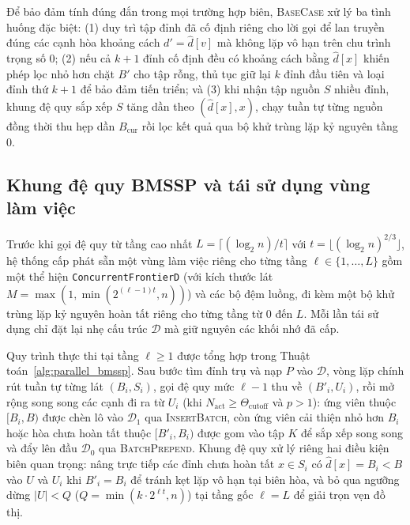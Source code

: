 Để bảo đảm tính đúng đắn trong mọi trường hợp biên, \textsc{BaseCase} xử lý ba tình huống đặc biệt: (1) duy trì tập đỉnh đã cố định riêng cho lời gọi để lan truyền đúng các cạnh hòa khoảng cách $d' = \widehat{d}[v]$ mà không lặp vô hạn trên chu trình trọng số $0$; (2) nếu cả $k + 1$ đỉnh cố định đều có khoảng cách bằng $\widehat{d}[x]$ khiến phép lọc nhỏ hơn chặt $B'$ cho tập rỗng, thủ tục giữ lại $k$ đỉnh đầu tiên và loại đỉnh thứ $k + 1$ để bảo đảm tiến triển; và (3) khi nhận tập nguồn $S$ nhiều đỉnh, khung đệ quy sắp xếp $S$ tăng dần theo $(\widehat{d}[x], x)$, chạy tuần tự từng nguồn đồng thời thu hẹp dần $B_{\mathrm{cur}}$ rồi lọc kết quả qua bộ khử trùng lặp kỷ nguyên tầng $0$.

\subsection{Khung đệ quy BMSSP và tái sử dụng vùng làm việc}\label{subsec:c2-bmssp-rec}

Trước khi gọi đệ quy từ tầng cao nhất $L = \lceil (\log_2 n) / t \rceil$ với $t = \lfloor (\log_2 n)^{2/3} \rfloor$, hệ thống cấp phát sẵn một vùng làm việc riêng cho từng tầng $\ell \in \{1, \ldots, L\}$ gồm một thể hiện \texttt{Concurrent\allowbreak FrontierD} (với kích thước lát $M = \max(1, \min(2^{(\ell-1)t}, n))$) và các bộ đệm luồng, đi kèm một bộ khử trùng lặp kỷ nguyên hoàn tất riêng cho từng tầng từ $0$ đến $L$. Mỗi lần tái sử dụng chỉ đặt lại nhẹ cấu trúc $\mathcal{D}$ mà giữ nguyên các khối nhớ đã cấp.

Quy trình thực thi tại tầng $\ell \ge 1$ được tổng hợp trong Thuật toán~\ref{alg:parallel_bmssp}. Sau bước tìm đỉnh trụ và nạp $P$ vào $\mathcal{D}$, vòng lặp chính rút tuần tự từng lát $(B_i, S_i)$, gọi đệ quy mức $\ell - 1$ thu về $(B'_i, U_i)$, rồi mở rộng song song các cạnh đi ra từ $U_i$ (khi $N_{\mathrm{act}} \ge \Theta_{\mathrm{cutoff}}$ và $p > 1$): ứng viên thuộc $[B_i, B)$ được chèn lô vào $\mathcal{D}_1$ qua \textsc{InsertBatch}, còn ứng viên cải thiện nhỏ hơn $B_i$ hoặc hòa chưa hoàn tất thuộc $[B'_i, B_i)$ được gom vào tập $K$ để sắp xếp song song và đẩy lên đầu $\mathcal{D}_0$ qua \textsc{BatchPrepend}. Khung đệ quy xử lý riêng hai điều kiện biên quan trọng: nâng trực tiếp các đỉnh chưa hoàn tất $x \in S_i$ có $\widehat{d}[x] = B_i < B$ vào $U$ và $U_i$ khi $B'_i = B_i$ để tránh kẹt lặp vô hạn tại biên hòa, và bỏ qua ngưỡng dừng $|U| < Q$ ($Q = \min(k \cdot 2^{\ell t}, n)$) tại tầng gốc $\ell = L$ để giải trọn vẹn đồ thị.

